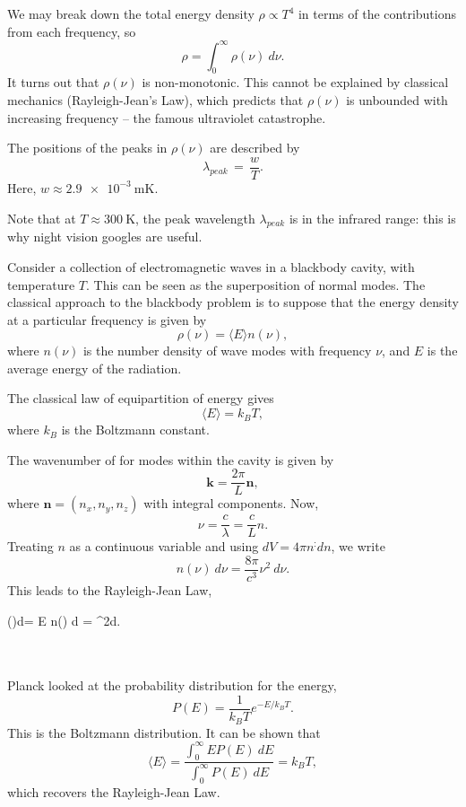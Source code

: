 \documentclass[11pt]{article}
\newcommand\ve[1]{\boldsymbol{#1}}
\newcommand\E[1]{\langle #1 \rangle}
\theoremstyle{definition}
\newenvironment{boxedeq*}%
    {\begin{equationbox}\begin{equation*}}%
    {\end{equation*}\end{equationbox}}
\theoremstyle{remark}
\numberwithin{equation}{section}
\begin{document}
    We may break down the total energy density $\rho \propto T^4$ in terms of the
    contributions from each frequency, so \[
        \rho = \int_0^\infty \rho(\nu) \:d\nu.
    \] 
    It turns out that $\rho(\nu)$ is non-monotonic. This cannot be explained by
    classical mechanics (Rayleigh-Jean's Law), which predicts that $\rho(\nu)$
    is unbounded with increasing frequency -- the famous ultraviolet catastrophe.

    \begin{theorem}
        The positions of the peaks in $\rho(\nu)$ are described by \[
            \lambda_{peak} \,=\, \frac{w}{T}.
        \]
        Here, $w \approx \SI{2.9e-3}{\milli\kelvin}$.  
    \end{theorem}
    Note that at $T \approx \SI{300}{\kelvin}$, the peak wavelength $\lambda_{peak}$
    is in the infrared range: this is why night vision googles are useful.
    
    Consider a collection of electromagnetic waves in a blackbody cavity, with
    temperature $T$. This can be seen as the superposition of normal modes.
    The classical approach to the blackbody problem is to suppose that the energy
    density at a particular frequency is given by \[
        \rho(\nu) = \E{E} n(\nu),
    \] where $n(\nu)$ is the number density of wave modes with frequency $\nu$, and
    $E$ is the average energy of the radiation.

    The classical law of equipartition of energy gives \[
        \E{E} = k_B T,
    \] where $k_B$ is the Boltzmann constant.

    The wavenumber of for modes within the cavity is given by \[
        \ve{k} = \frac{2\pi}{L}\ve{n},
    \] where $\ve{n} = (n_x, n_y, n_z)$ with integral components. Now, \[
        \nu = \frac{c}{\lambda} = \frac{c}{L}n.
    \] Treating $n$ as a continuous variable and using $dV = 4\pi n^:dn$, we write
    \[
        n(\nu)\:d\nu = \frac{8\pi}{c^3}\nu^2\:d\nu.
    \] This leads to the Rayleigh-Jean Law,
    \begin{boxedeq*}
        \rho(\nu)\:d\nu = \E{E} n(\nu) \:d\nu 
            = \nu^2\:d\nu.
    \end{boxedeq*}\\~\\

    Planck looked at the probability distribution for the energy, \[
        P(E) = \frac{1}{k_B T}e^{-E /k_B T}.
    \] This is the Boltzmann distribution. It can be shown that \[
        \E{E} = \frac{\int_0^\infty E P(E) \:dE}{\int_0^\infty P(E) \: dE} 
        = k_B T,
    \] which recovers the Rayleigh-Jean Law.
\end{document}
